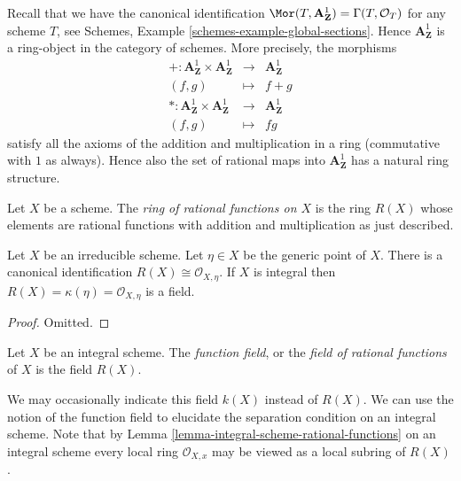 \medskip\noindent
Recall that we have the canonical identification
$\Mor(T, \mathbf{A}^1_{\mathbf{Z}}) = \Gamma(T, \mathcal{O}_T)$
for any scheme $T$, see Schemes, Example \ref{schemes-example-global-sections}.
Hence $\mathbf{A}^1_{\mathbf{Z}}$ is a ring-object in the
category of schemes. More precisely, the morphisms
\begin{eqnarray*}
+ : \mathbf{A}^1_{\mathbf{Z}} \times \mathbf{A}^1_{\mathbf{Z}}
& \longrightarrow &
\mathbf{A}^1_{\mathbf{Z}} \\
(f, g) & \longmapsto & f + g \\
* : \mathbf{A}^1_{\mathbf{Z}} \times \mathbf{A}^1_{\mathbf{Z}}
& \longrightarrow &
\mathbf{A}^1_{\mathbf{Z}} \\
(f, g) & \longmapsto & fg
\end{eqnarray*}
satisfy all the axioms of the addition and multiplication in a ring
(commutative with $1$ as always). Hence also the set of rational
maps into $\mathbf{A}^1_{\mathbf{Z}}$ has a natural ring structure.

\begin{definition}
\label{definition-ring-of-rational-functions}
Let $X$ be a scheme. The {\it ring of rational functions on $X$}
is the ring $R(X)$ whose elements are rational functions with
addition and multiplication as just described.
\end{definition}

\begin{lemma}
\label{lemma-integral-scheme-rational-functions}
Let $X$ be an irreducible scheme. Let $\eta \in X$ be the generic point
of $X$. There is a canonical identification
$R(X) \cong \mathcal{O}_{X, \eta}$. If $X$ is integral then
$R(X) = \kappa(\eta) = \mathcal{O}_{X, \eta}$ is
a field.
\end{lemma}

\begin{proof}
Omitted.
\end{proof}

\begin{definition}
\label{definition-function-field}
Let $X$ be an integral scheme.
The {\it function field}, or the {\it field of rational functions}
of $X$ is the field $R(X)$.
\end{definition}

\noindent
We may occasionally indicate this field $k(X)$ instead of $R(X)$.
We can use the notion of the function field to elucidate the
separation condition on an integral scheme.
Note that by Lemma \ref{lemma-integral-scheme-rational-functions}
on an integral scheme every local ring $\mathcal{O}_{X, x}$ may be viewed
as a local subring of $R(X)$.

